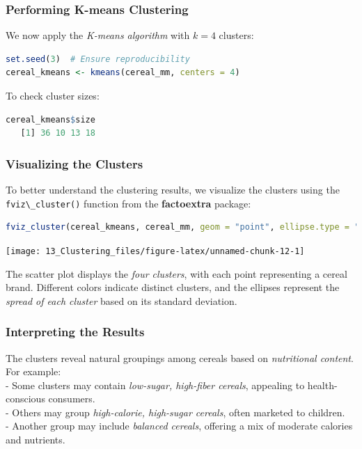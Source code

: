 \documentclass[
  11pt,
]{book}
\newcommand{\passthrough}[1]{#1}
\theoremstyle{definition}
\theoremstyle{definition}
\theoremstyle{definition}
\theoremstyle{definition}
\theoremstyle{remark}
\begin{document}
\subsubsection*{Performing K-means Clustering}\label{performing-k-means-clustering}


We now apply the \emph{K-means algorithm} with \(k = 4\) clusters:

\begin{lstlisting}[language=R]
set.seed(3)  # Ensure reproducibility
cereal_kmeans <- kmeans(cereal_mm, centers = 4)
\end{lstlisting}

To check cluster sizes:

\begin{lstlisting}[language=R]
cereal_kmeans$size
   [1] 36 10 13 18
\end{lstlisting}

\subsubsection*{Visualizing the Clusters}\label{visualizing-the-clusters}


To better understand the clustering results, we visualize the clusters using the \passthrough{\lstinline!fviz\_cluster()!} function from the \textbf{factoextra} package:

\begin{lstlisting}[language=R]
fviz_cluster(cereal_kmeans, cereal_mm, geom = "point", ellipse.type = "norm", palette = "custom_palette")
\end{lstlisting}

\begin{center}\texttt{[image: 13\_Clustering\_files/figure-latex/unnamed-chunk-12-1]} \end{center}

The scatter plot displays the \emph{four clusters}, with each point representing a cereal brand. Different colors indicate distinct clusters, and the ellipses represent the \emph{spread of each cluster} based on its standard deviation.

\subsubsection*{Interpreting the Results}\label{interpreting-the-results}


The clusters reveal natural groupings among cereals based on \emph{nutritional content}. For example:\\
- Some clusters may contain \emph{low-sugar, high-fiber cereals}, appealing to health-conscious consumers.\\
- Others may group \emph{high-calorie, high-sugar cereals}, often marketed to children.\\
- Another group may include \emph{balanced cereals}, offering a mix of moderate calories and nutrients.
\end{document}
